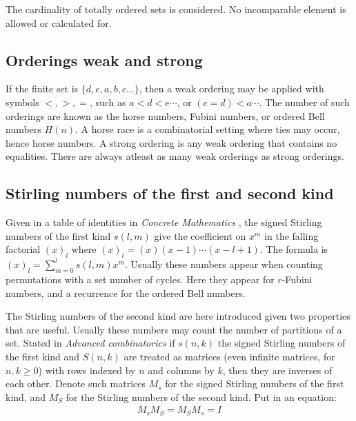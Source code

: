 \documentclass[12pt,reqno]{article}
\begin{document}
The cardinality of totally ordered sets is considered. No incomparable element is allowed or calculated for.

\subsection{Orderings weak and strong}
If the finite set is $\{d,e,a,b,c \ldots\}$, then a weak ordering may be applied with symbols $<, >, =$, such as $a < d < e \cdots $, or $(c = d) < a \cdots$. The number of such orderings are known as the horse numbers, Fubini numbers, or ordered Bell numbers $H(n)$. A horse race is a combinatorial setting where ties may occur, hence horse numbers. A strong ordering is any weak ordering that contains no equalities. There are always atleast as many weak orderings as strong orderings.

\subsection{Stirling numbers of the first and second kind}\label{sec:stirling}\label{int:matinv}\label{int:eveper}
Given in a table of identities in {\em Concrete Mathematics} \cite{cc:cm}, the signed Stirling numbers of the first kind $s(l, m)$ give the coefficient on $x^{m}$ in the falling factorial $(x)_{l}$ where $(x)_{l} = (x) (x - 1) \cdots (x -l + 1)$. The formula is $(x)_{l} = \sum_{m = 0}^{l} s(l,m)x^{m}$. Usually these numbers appear when counting permutations with a set number of cycles. Here they appear for $r$-Fubini numbers, and a recurrence for the ordered Bell numbers.

The Stirling numbers of the second kind are here introduced given two properties that are useful. Usually these numbers may count the number of partitions of a set. Stated in \textit{Advanced combinatorics} \cite{cc:matrix} if $s(n,k)$ the signed Stirling numbers of the first kind and $S(n,k)$ are treated as matrices (even infinite matrices, for $n,k \geq 0$) with rows indexed by $n$ and columns by $k$, then they are inverses of each other. Denote such matrices $M_{s}$ for the signed Stirling numbers of the first kind, and $M_{S}$ for the Stirling numbers of the second kind. Put in an equation:
\begin{align}
	M_{s} M_{S} = M_{S} M_{s} = I \label{eqn:invs}
\end{align}
\end{document}
